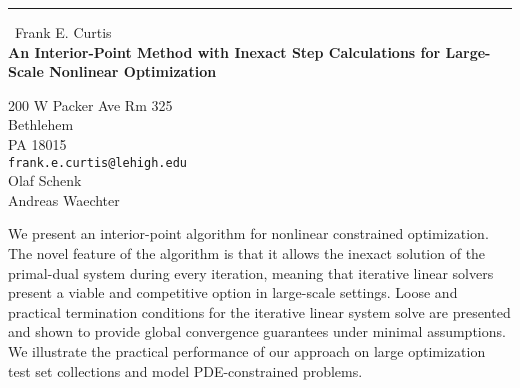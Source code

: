 \documentclass{report}
\begin{document}
\begin{center}
\rule{6in}{1pt} \
{\large Frank E. Curtis \\
{\bf An Interior-Point Method with Inexact Step Calculations for Large-Scale Nonlinear Optimization}}

200 W Packer Ave Rm 325 \\ Bethlehem \\ PA 18015
\\
{\tt frank.e.curtis@lehigh.edu}\\
Olaf Schenk\\
Andreas Waechter\end{center}

We present an interior-point algorithm for nonlinear constrained
optimization. The novel feature of the algorithm is that it allows the
inexact solution of the primal-dual system during every iteration,
meaning that iterative linear solvers present a viable and competitive
option in large-scale settings. Loose and practical termination
conditions for the iterative linear system solve are presented and shown
to provide global convergence guarantees under minimal assumptions. We
illustrate the practical performance of our approach on large
optimization test set collections and model PDE-constrained problems.
\end{document}

